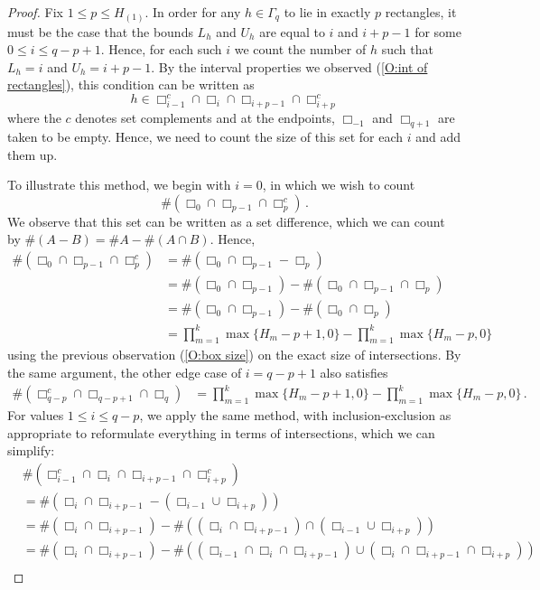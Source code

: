 \documentclass[11pt, oneside]{amsart}   	%
\newcommand{\1}{\mathbbm{1}}
\theoremstyle{definition}
\begin{document}
\begin{proof}
Fix $1 \leq p \leq H_{(1)}$. In order for any $h \in \Gamma_q$ to lie in exactly $p$ rectangles, it must be the case that the bounds $L_h$ and $U_h$ are equal to $i$ and $i+p-1$ for some $0 \leq i \leq q - p + 1$. Hence, for each such $i$ we count the number of $h$ such that $L_h = i$ and $U_h = i + p-1$. By the interval properties we observed (\ref{O:int of rectangles}), this condition can be written as
$$h \in \Box_{i-1}^c \cap \Box_{i} \cap \Box_{i+p-1} \cap \Box_{i + p}^c$$
where the $c$ denotes set complements and at the endpoints, $\Box_{-1}$ and $\Box_{q +1}$ are taken to be empty. Hence, we need to count the size of this set for each $i$ and add them up.

To illustrate this method, we begin with $i=0$, in which we wish to count
$$\# (\Box_0 \cap \Box_{p-1} \cap \Box_{p}^c)\, . $$
We observe that this set can be written as a set difference, which we can count by $\#(A - B) = \#A - \#(A \cap B)$. Hence,
\begin{align*}
\# (\Box_0 \cap \Box_{p-1} \cap \Box_{p}^c) &= \# (\Box_0 \cap \Box_{p-1} - \Box_{p}) \\
&= \# (\Box_0 \cap \Box_{p-1}) - \# (\Box_0 \cap \Box_{p-1} \cap \Box_{p}) \\
&= \# (\Box_0 \cap \Box_{p-1}) - \# (\Box_0 \cap \Box_{p}) \\
&= \prod_{m=1}^k \max\{H_m - p + 1, 0\} - \prod_{m=1}^k \max\{H_m - p, 0\}
\end{align*}
using the previous observation (\ref{O:box size}) on the exact size of intersections. By the same argument, the other edge case of $i = q - p+1$ also satisfies
\begin{align*}
\# (\Box_{q-p}^c \cap \Box_{q-p+1} \cap \Box_{q}) &= \prod_{m=1}^k \max\{H_m - p + 1, 0\} - \prod_{m=1}^k \max\{H_m - p, 0\} \, .
\end{align*}
For values $1 \leq i \leq q - p$, we apply the same method, with inclusion-exclusion as appropriate to reformulate everything in terms of intersections, which we can simplify:
\begin{align*}
&\# (\Box_{i-1}^c \cap \Box_i \cap \Box_{i+p-1} \cap \Box_{i + p}^c) \\
&= \# (\Box_i \cap \Box_{i+p-1} - (\Box_{i-1} \cup \Box_{i + p})) \\
&=  \# (\Box_i \cap \Box_{i+p-1}) - \#((\Box_i \cap \Box_{i+p-1}) \cap (\Box_{i-1} \cup \Box_{i + p})) \\
&=  \# (\Box_i \cap \Box_{i+p-1}) - \#(( \Box_{i-1} \cap \Box_i \cap \Box_{i+p-1} ) \cup ( \Box_i \cap \Box_{i+p-1}\cap \Box_{i + p})) \\

\end{align*}
\end{proof}
\end{document}
